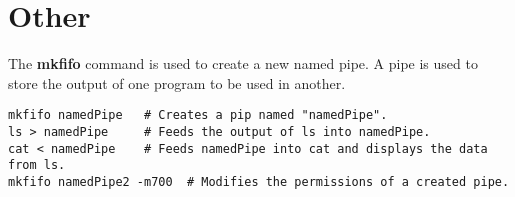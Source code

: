 \section{Other}

The \textbf{mkfifo} command is used to create a new named pipe. A pipe is used to store the output of one program to be used in another.
\begin{lstlisting}
mkfifo namedPipe   # Creates a pip named "namedPipe".
ls > namedPipe     # Feeds the output of ls into namedPipe.
cat < namedPipe    # Feeds namedPipe into cat and displays the data from ls.
mkfifo namedPipe2 -m700  # Modifies the permissions of a created pipe.
\end{lstlisting}